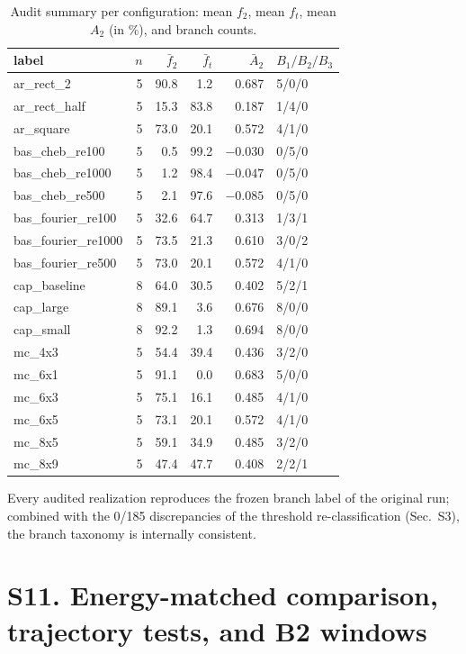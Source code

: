 \documentclass[11pt]{article}
\begin{document}
\begin{table}[h]
\centering\footnotesize
\caption{Audit summary per configuration: mean $f_2$, mean $f_t$, mean $A_2$
(in \%), and branch counts.}
\label{tab:S10b}
\begin{tabular}{lrrrrl}
\toprule
label & $n$ & $\bar f_2$ & $\bar f_t$ & $\bar A_2$ & $B_1/B_2/B_3$\\
\midrule
ar\_rect\_2 & 5 & 90.8 & 1.2 & 0.687 & 5/0/0\\
ar\_rect\_half & 5 & 15.3 & 83.8 & 0.187 & 1/4/0\\
ar\_square & 5 & 73.0 & 20.1 & 0.572 & 4/1/0\\
bas\_cheb\_re100 & 5 & 0.5 & 99.2 & $-0.030$ & 0/5/0\\
bas\_cheb\_re1000 & 5 & 1.2 & 98.4 & $-0.047$ & 0/5/0\\
bas\_cheb\_re500 & 5 & 2.1 & 97.6 & $-0.085$ & 0/5/0\\
bas\_fourier\_re100 & 5 & 32.6 & 64.7 & 0.313 & 1/3/1\\
bas\_fourier\_re1000 & 5 & 73.5 & 21.3 & 0.610 & 3/0/2\\
bas\_fourier\_re500 & 5 & 73.0 & 20.1 & 0.572 & 4/1/0\\
cap\_baseline & 8 & 64.0 & 30.5 & 0.402 & 5/2/1\\
cap\_large & 8 & 89.1 & 3.6 & 0.676 & 8/0/0\\
cap\_small & 8 & 92.2 & 1.3 & 0.694 & 8/0/0\\
mc\_4x3 & 5 & 54.4 & 39.4 & 0.436 & 3/2/0\\
mc\_6x1 & 5 & 91.1 & 0.0 & 0.683 & 5/0/0\\
mc\_6x3 & 5 & 75.1 & 16.1 & 0.485 & 4/1/0\\
mc\_6x5 & 5 & 73.1 & 20.1 & 0.572 & 4/1/0\\
mc\_8x5 & 5 & 59.1 & 34.9 & 0.485 & 3/2/0\\
mc\_8x9 & 5 & 47.4 & 47.7 & 0.408 & 2/2/1\\
\bottomrule
\end{tabular}
\end{table}

Every audited realization reproduces the frozen branch label of the original
run; combined with the 0/185 discrepancies of the threshold re-classification
(Sec.~S3), the branch taxonomy is internally consistent.

\section{S11. Energy-matched comparison, trajectory tests, and B2 windows}
\label{sec:S11}
\end{document}
